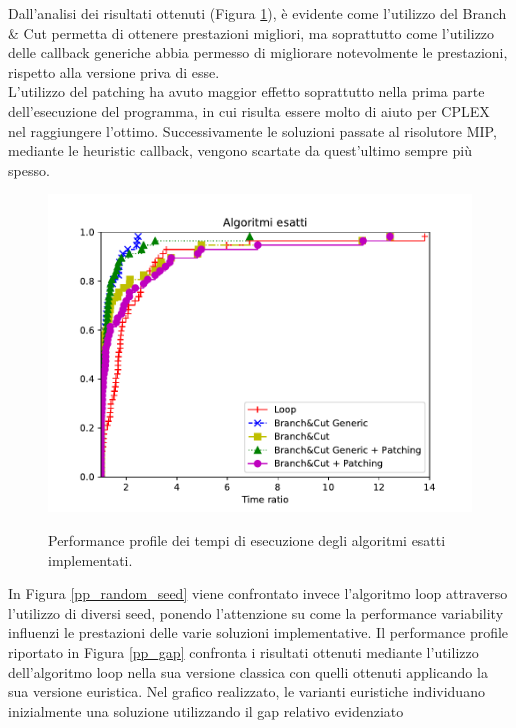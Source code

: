 Dall'analisi dei risultati ottenuti (Figura \ref{pp_exact}), è evidente come l'utilizzo del Branch \& Cut permetta di ottenere prestazioni migliori, ma soprattutto come l'utilizzo delle callback generiche abbia permesso di migliorare notevolmente le prestazioni, rispetto alla versione priva di esse.\\
L'utilizzo del patching ha avuto maggior effetto soprattutto nella prima parte dell'esecuzione del programma, in cui risulta essere molto di aiuto per CPLEX nel raggiungere l'ottimo. Successivamente le soluzioni passate al risolutore MIP, mediante le heuristic callback, vengono scartate da quest'ultimo sempre più spesso.\\
\begin{figure}[H] 
\begin{center} 
  \includegraphics[scale=0.75]{Images/pp_exact}\\ 
  \caption{\footnotesize{Performance profile dei tempi di esecuzione degli algoritmi esatti implementati.}}
  \label{pp_exact} 
\end{center} 
\end{figure}
In Figura \ref{pp_random_seed} viene confrontato invece l'algoritmo loop attraverso l'utilizzo di diversi seed, ponendo l'attenzione su come la performance variability influenzi le prestazioni delle varie soluzioni implementative.
Il performance profile riportato in Figura \ref{pp_gap} confronta i risultati ottenuti mediante l'utilizzo dell'algoritmo loop nella sua versione classica con quelli ottenuti applicando la sua versione euristica. Nel grafico realizzato, le varianti euristiche individuano inizialmente una soluzione utilizzando il gap relativo evidenziato 
